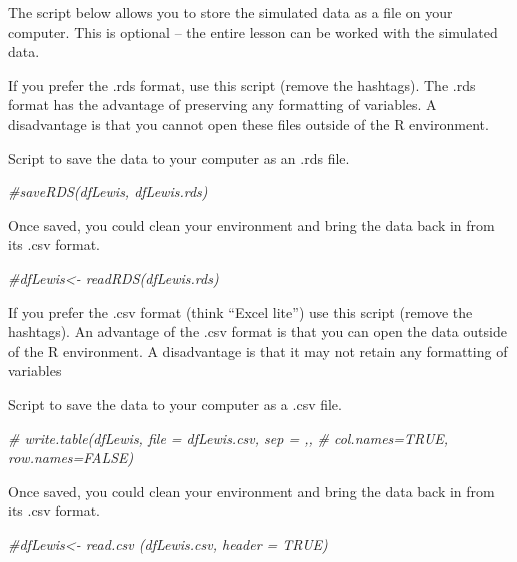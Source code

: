 \documentclass[
  11pt,
]{book}
\newenvironment{Shaded}{\begin{snugshade}}{\end{snugshade}}
\newcommand{\CommentTok}[1]{\textcolor[rgb]{0.37,0.37,0.37}{\textit{#1}}}
\begin{document}
The script below allows you to store the simulated data as a file on your computer. This is optional -- the entire lesson can be worked with the simulated data.

If you prefer the .rds format, use this script (remove the hashtags). The .rds format has the advantage of preserving any formatting of variables. A disadvantage is that you cannot open these files outside of the R environment.

Script to save the data to your computer as an .rds file.

\begin{Shaded}
\begin{Highlighting}[]
\CommentTok{\#saveRDS(dfLewis, \textquotesingle{}dfLewis.rds\textquotesingle{})  }
\end{Highlighting}
\end{Shaded}

Once saved, you could clean your environment and bring the data back in from its .csv format.

\begin{Shaded}
\begin{Highlighting}[]
\CommentTok{\#dfLewis\textless{}{-} readRDS(\textquotesingle{}dfLewis.rds\textquotesingle{})}
\end{Highlighting}
\end{Shaded}

If you prefer the .csv format (think ``Excel lite'') use this script (remove the hashtags). An advantage of the .csv format is that you can open the data outside of the R environment. A disadvantage is that it may not retain any formatting of variables

Script to save the data to your computer as a .csv file.

\begin{Shaded}
\begin{Highlighting}[]
\CommentTok{\# write.table(dfLewis, file = \textquotesingle{}dfLewis.csv\textquotesingle{}, sep = \textquotesingle{},\textquotesingle{},}
\CommentTok{\# col.names=TRUE, row.names=FALSE)}
\end{Highlighting}
\end{Shaded}

Once saved, you could clean your environment and bring the data back in from its .csv format.

\begin{Shaded}
\begin{Highlighting}[]
\CommentTok{\#dfLewis\textless{}{-} read.csv (\textquotesingle{}dfLewis.csv\textquotesingle{}, header = TRUE)}
\end{Highlighting}
\end{Shaded}
\end{document}
